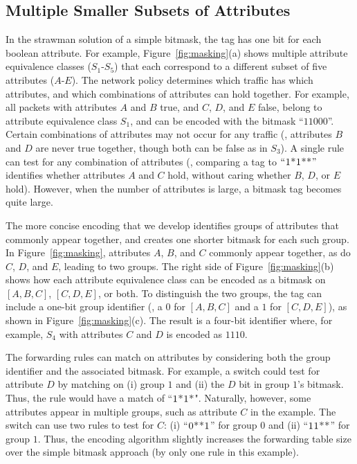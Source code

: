 \subsection{Multiple Smaller Subsets of Attributes}
\label{ssec:mset}
In the strawman solution of a simple bitmask, the tag has one bit for
each boolean attribute.  For example, Figure~\ref{fig:masking}(a)
shows multiple attribute equivalence classes ($S_1$-$S_5$) that each
correspond to a different subset of five attributes ($A$-$E$).  The
network policy determines which traffic has which attributes, and
which combinations of attributes can hold together.  For example, all
packets with attributes $A$ and $B$ true, and $C$, $D$, and $E$ false,
belong to attribute equivalence class $S_1$, and can be encoded with
the bitmask ``$11000$''.  Certain combinations of attributes may not
occur for any traffic (\eg, attributes $B$ and $D$ are never true
together, though both can be false as in $S_3$).  A single rule can
test for any combination of attributes (\eg, comparing a tag to
$\textsc{``1*1**''}$ identifies whether attributes $A$ and $C$ hold, without
caring whether $B$, $D$, or $E$ hold).  However, when the number of
attributes is large, a bitmask tag becomes quite large.

The more concise encoding that we develop identifies groups of attributes that
commonly appear together, and creates one shorter bitmask for each
such group.  In Figure~\ref{fig:masking}, attributes
$A$, $B$, and $C$ commonly appear together, as do $C$, $D$, and $E$,
leading to two groups.  The right side of Figure~\ref{fig:masking}(b)
shows how each attribute equivalence class can be encoded as a bitmask
on $[A,B,C]$, $[C,D,E]$, or both.  To distinguish the two
groups, the tag can include a one-bit group identifier (\eg, a $0$
for $[A,B,C]$ and a $1$ for $[C,D,E]$), as shown in
Figure~\ref{fig:masking}(c).  The result is a four-bit identifier
where, for example, $S_4$ with attributes $C$ and $D$ is encoded as
$1110$.

The forwarding rules can match on attributes by considering both the
group identifier and the associated bitmask.  For example, a switch
could test for attribute $D$ by matching on (i) group $1$ and (ii) the
$D$ bit in group $1$'s bitmask.  Thus, the rule would have a match of
``$\textsc{1*1*}$".  Naturally, however, some attributes appear in multiple groups, such
as attribute $C$ in the example.  The switch can use two rules to test
for $C$: (i) ``$\textsc{0**1}$'' for group $0$ and (ii) ``$\textsc{11**}$'' for group
$1$.  Thus, the encoding algorithm slightly increases the forwarding
table size over the simple bitmask approach (by only one rule in
this example).

